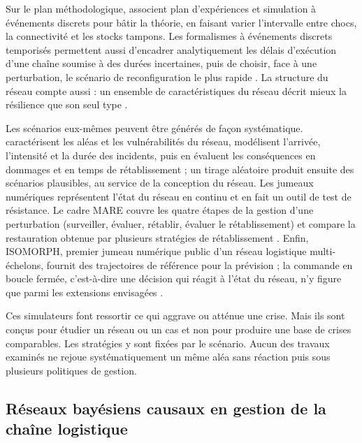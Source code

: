 Sur le plan méthodologique, \citet{macdonald2018} associent plan d'expériences et simulation à événements discrets pour bâtir la théorie, en faisant varier l'intervalle entre chocs, la connectivité et les stocks tampons. Les formalismes à événements discrets temporisés permettent aussi d'encadrer analytiquement les délais d'exécution d'une chaîne soumise à des durées incertaines, puis de choisir, face à une perturbation, le scénario de reconfiguration le plus rapide \citep{rajah2025}. La structure du réseau compte aussi \citep{kim2015} : un ensemble de caractéristiques du réseau décrit mieux la résilience que son seul type \citep{li2020}.

Les scénarios eux-mêmes peuvent être générés de façon systématique. \citet{klibi2012ejor} caractérisent les aléas et les vulnérabilités du réseau, modélisent l'arrivée, l'intensité et la durée des incidents, puis en évaluent les conséquences en dommages et en temps de rétablissement ; un tirage aléatoire produit ensuite des scénarios plausibles, au service de la conception du réseau. Les jumeaux numériques représentent l'état du réseau en continu \citep{ivanovdolgui2021ppc} et \citet{ivanov2023} en fait un outil de test de résistance. Le cadre MARE couvre les quatre étapes de la gestion d'une perturbation (surveiller, évaluer, rétablir, évaluer le rétablissement) et compare la restauration obtenue par plusieurs stratégies de rétablissement \citep{ramzy2022}. Enfin, ISOMORPH, premier jumeau numérique public d'un réseau logistique multi-échelons, fournit des trajectoires de référence pour la prévision ; la commande en boucle fermée, c'est-à-dire une décision qui réagit à l'état du réseau, n'y figure que parmi les extensions envisagées \citep{zhang2026isomorph}.

Ces simulateurs font ressortir ce qui aggrave ou atténue une crise. Mais ils sont conçus pour étudier un réseau ou un cas et non pour produire une base de crises comparables. Les stratégies y sont fixées par le scénario. Aucun des travaux examinés ne rejoue systématiquement un même aléa sans réaction puis sous plusieurs politiques de gestion.

\subsection{Réseaux bayésiens causaux en gestion de la chaîne logistique}
\label{sec:ea-rb}

